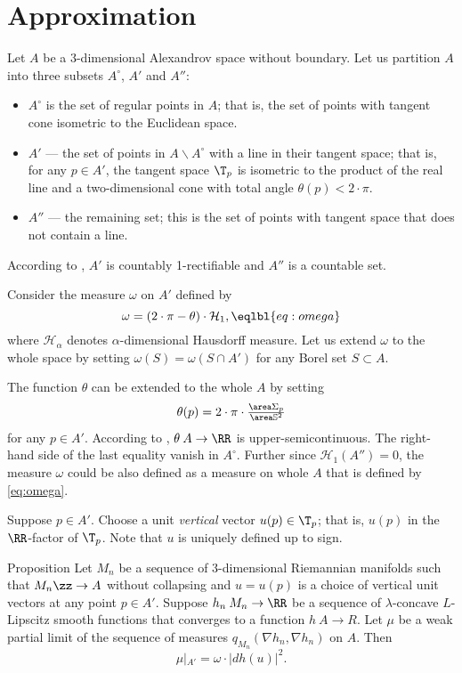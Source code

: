 \section{Approximation}


Let $A$ be a 3-dimensional Alexandrov space without boundary. 
Let us partition $A$ into three subsets $A^\circ$, $A'$ and $A''$:
\begin{itemize}
\item $A^\circ$ is the set of regular points in $A$; that is, the set of points with tangent cone isometric to the Euclidean space.
\item $A'$ --- the set of points in $A\backslash A^\circ$ with a line in their tangent space; that is, for any $p\in A'$, the tangent space $\T_p$ is isometric to the product of the real line and a two-dimensional cone with total angle $\theta(p)<2\cdot \pi$.
\item $A''$ --- the remaining set; this is the set of points with tangent space that does not contain a line.
\end{itemize}
According to \cite{li-naber}, $A'$ is countably 1-rectifiable and $A''$ is a countable set. 

Consider the measure $\omega$ on $A'$ defined by
\[\omega=(2\cdot\pi-\theta)\cdot \mathcal{H}_1,\eqlbl{eq:omega}\]
where $\mathcal{H}_\alpha$ denotes $\alpha$-dimensional Hausdorff measure.
Let us extend $\omega$ to the whole space by setting $\omega(S)=\omega(S\cap A')$ for any Borel set $S\subset A$.

The function $\theta$ can be extended to the whole $A$ by setting
\[\theta(p)=2\cdot\pi\cdot \tfrac{\area \Sigma_p}{\area \mathbb{S}^2}\] for any $p\in A'$.
According to \cite[7.14]{BGP}, $\theta\:A\to \RR$ is upper-semicontinuous.
The right-hand side of the last equality vanish in $A^\circ$.
Further since $\mathcal{H}_1(A'')=0$, the measure $\omega$ could be also defined as a measure on whole $A$ that is defined by \ref{eq:omega}.

Suppose $p\in A'$.
Choose a unit \emph{vertical} vector $u(p)\in \T_p$;
that is, $u(p)$ in the $\RR$-factor of $\T_p$.
Note that $u$ is uniquely defined up to sign.

\begin{thm}{Proposition}\label{prop:str-converge}
Let $M_n$ be a sequence of $3$-dimensional Riemannian manifolds such that $M_n\zz\to A$ without collapsing and 
$u=u(p)$ is a choice of vertical unit vectors at any point $p\in A'$.
Suppose $h_n\:M_n\to\RR$ be a sequence of $\lambda$-concave $L$-Lipscitz smooth functions that converges to a function $h\:A\to R$.
Let $\mu$ be a weak partial limit of the sequence of measures $q_{M_n}(\nabla h_n,\nabla h_n)$ on $A$.
Then 
\[\mu|_{A'}=\omega\cdot |dh(u)|^2.\]
\end{thm}


